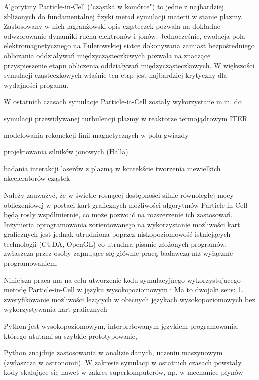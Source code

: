 Algorytmy Particle-in-Cell ("cząstka w komórce") to jedne z najbardziej zbliżonych do fundamentalnej fizyki
metod symulacji materii w stanie plazmy. Zastosowany w nich lagranżowski opis cząsteczek pozwala na dokładne
odwzorowanie dynamiki ruchu elektronów i jonów. Jednocześnie, ewolucja pola elektromagnetycznego na Eulerowskiej
siatce dokonywana zamiast bezpośredniego obliczania oddziaływań międzycząsteczkowych pozwala na znaczące
przyspieszenie etapu obliczenia oddziaływań międzycząsteczkowych. W większości symulacji cząsteczkowych właśnie
ten etap jest najbardziej krytyczny dla wydajności progamu.

W ostatnich czasach symulacje Particle-in-Cell zostały wykorzystane m.in. do
\item symulacji przewidywanej turbulencji plazmy w reaktorze termojądrowym ITER %
\item modelowania rekonekcji linii magnetycznych w polu gwiazdy %
\item projektowania silników jonowych (Halla) %
\item badania interakcji laserów z plazmą w kontekście tworzenia niewielkich akceleratorów cząstek %

Należy zauważyć, że w świetle rosnącej dostępności silnie równoległej mocy obliczeniowej w postaci kart graficznych %
możliwości algorytmów Particle-in-Cell będą rosły współmiernie, co może pozwolić na rozszerzenie ich zastosowań.
Inżynieria oprogramowania zorientowanego na wykorzystanie możliwości kart graficznych jest jednak utrudniona poprzez
niskopoziomowość %
istniejących technologii (CUDA, OpenGL) %
co utrudnia pisanie złożonych programów, zwłaszcza przez osoby zajmujące się głównie pracą badawczą
niż wyłącznie programowaniem. %

Niniejsza praca ma na celu utworzenie kodu symulacyjnego wykorzystującego metodę Particle-in-Cell w języku
wysokopoziomowym i %
Ma to dwojaki sens:
1. zweryfikowanie możliwości leżących w obecnych językach wysokopoziomowych bez wykorzystywania kart graficznych

Python jest wysokopoziomowym, interpretowanym językiem programowania, którego atutami są szybkie prototypowanie,

Python znajduje zastosowania w analizie danych, uczeniu maszynowym (zwłaszcza w astronomii). W zakresie symulacji
w ostatnich czasach powstały kody skalujące się nawet w zakres superkomputerów, np. w mechanice płynów %


